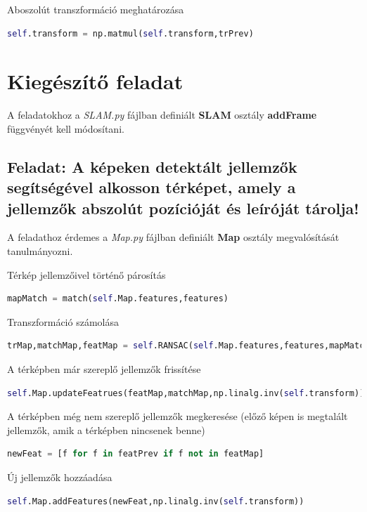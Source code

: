 \documentclass[12pt,a4paper,oneside]{report}             %
\begin{document}
Aboszolút transzformáció meghatározása

\begin{lstlisting}[language=Python]
self.transform = np.matmul(self.transform,trPrev)
\end{lstlisting}

\section{Kiegészítő feladat}

A feladatokhoz a \emph{SLAM.py} fájlban definiált \textbf{SLAM} osztály \textbf{addFrame} függvényét kell módosítani.

\subsection{Feladat: A képeken detektált jellemzők segítségével alkosson térképet, amely a jellemzők abszolút pozícióját és leíróját tárolja!}

A feladathoz érdemes a \emph{Map.py} fájlban definiált \textbf{Map} osztály megvalósítását tanulmányozni.

Térkép jellemzőivel történő párosítás

\begin{lstlisting}[language=Python]
mapMatch = match(self.Map.features,features)
\end{lstlisting}

Transzformáció számolása
\begin{lstlisting}[language=Python]
trMap,matchMap,featMap = self.RANSAC(self.Map.features,features,mapMatch)
\end{lstlisting}

A térképben már szereplő jellemzők frissítése

\begin{lstlisting}[language=Python]
self.Map.updateFeatrues(featMap,matchMap,np.linalg.inv(self.transform))
\end{lstlisting}

A térképben még nem szereplő jellemzők megkeresése (előző képen is megtalált jellemzők, amik a térképben nincsenek benne)

\begin{lstlisting}[language=Python]
newFeat = [f for f in featPrev if f not in featMap]
\end{lstlisting}

Új jellemzők hozzáadása

\begin{lstlisting}[language=Python]
self.Map.addFeatures(newFeat,np.linalg.inv(self.transform))
\end{lstlisting}
\end{document}
